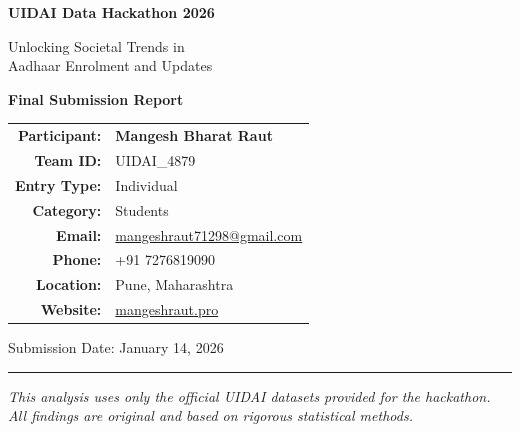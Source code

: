 \documentclass[12pt,a4paper]{article}
\begin{document}

\begin{titlepage}
    \centering
    \vspace*{1.5cm}
    
    {\Huge\bfseries\color{uidaiblue} UIDAI Data Hackathon 2026\par}
    
    \vspace{0.5cm}
    
    {\Large\color{uidaipurple} Unlocking Societal Trends in\\Aadhaar Enrolment and Updates\par}
    
    \vspace{2cm}
    
    {\LARGE\bfseries Final Submission Report\par}
    
    \vspace{2cm}
    
    \begin{tabular}{rl}
        \textbf{Participant:} & \textbf{Mangesh Bharat Raut} \\[0.3cm]
        \textbf{Team ID:} & UIDAI\_4879 \\[0.3cm]
        \textbf{Entry Type:} & Individual \\[0.3cm]
        \textbf{Category:} & Students \\[0.3cm]
        \textbf{Email:} & \href{mailto:mangeshraut71298@gmail.com}{mangeshraut71298@gmail.com} \\[0.3cm]
        \textbf{Phone:} & +91 7276819090 \\[0.3cm]
        \textbf{Location:} & Pune, Maharashtra \\[0.3cm]
        \textbf{Website:} & \href{https://mangeshraut.pro/}{mangeshraut.pro} \\[0.3cm]
    \end{tabular}
    
    \vfill
    
    {\large Submission Date: January 14, 2026\par}
    
    \vspace{1cm}
    
    \hrule
    \vspace{0.3cm}
    {\small\textit{This analysis uses only the official UIDAI datasets provided for the hackathon.\\All findings are original and based on rigorous statistical methods.}}
    
\end{titlepage}
\end{document}
